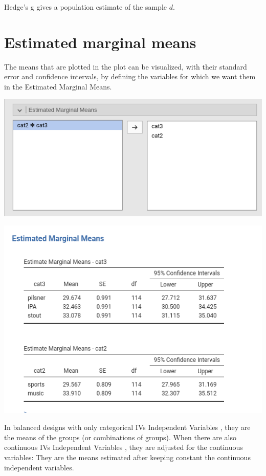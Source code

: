 \documentclass[
]{book}
\begin{document}
Hedge's g gives a population estimate of the sample \(d\).

\hypertarget{estimated-marginal-means}{%
\section{Estimated marginal means}\label{estimated-marginal-means}}

The means that are plotted in the plot can be visualized, with their standard error and confidence intervals, by defining the variables for which we want them in the {Estimated Marginal Means}.

\includegraphics[width=7.92in]{bookletpics/2_anova_input7}

\includegraphics[width=7.28in]{bookletpics/2_anova_output7}

In balanced designs with only categorical {IVs {Independent Variables} }, they are the means of the groups (or combinations of groups). When there are also continuous {IVs {Independent Variables} }, they are adjusted for the continuous variables: They are the means estimated after keeping constant the continuous independent variables.
\end{document}
